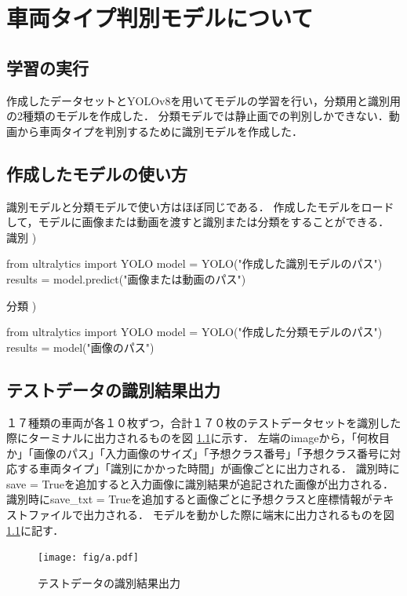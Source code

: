 

\chapter{車両タイプ判別モデルについて}\label{model}


\section{学習の実行}
作成したデータセットとYOLOv8を用いてモデルの学習を行い，分類用と識別用の2種類のモデルを作成した．
分類モデルでは静止画での判別しかできない．動画から車両タイプを判別するために識別モデルを作成した．


\section{作成したモデルの使い方}
識別モデルと分類モデルで使い方はほぼ同じである．
作成したモデルをロードして，モデルに画像または動画を渡すと識別または分類をすることができる．\\
識別 )
\begin{verbatimx}
	from ultralytics import YOLO
	model = YOLO("作成した識別モデルのパス")
	results = model.predict("画像または動画のパス")
\end{verbatimx}
分類 )
\begin{verbatimx}
	from ultralytics import YOLO
	model = YOLO("作成した分類モデルのパス")
	results = model("画像のパス")
\end{verbatimx}

\section{テストデータの識別結果出力}
１７種類の車両が各１０枚ずつ，合計１７０枚のテストデータセットを識別した際にターミナルに出力されるものを図 \ref{output}に示す．
左端のimageから，「何枚目か」「画像のパス」「入力画像のサイズ」「予想クラス番号」「予想クラス番号に対応する車両タイプ」「識別にかかった時間」が画像ごとに出力される．
識別時にsave = Trueを追加すると入力画像に識別結果が追記された画像が出力される．
識別時にsave\_txt = Trueを追加すると画像ごとに予想クラスと座標情報がテキストファイルで出力される．
モデルを動かした際に端末に出力されるものを図\ref{output}に記す．
\begin{figure}	
	\centering
	\texttt{[image: fig/a.pdf]}
	\caption{テストデータの識別結果出力}\label{output}
\end{figure}

